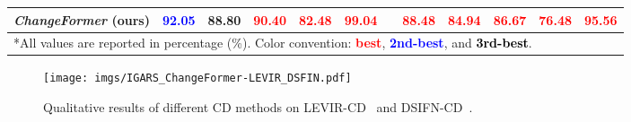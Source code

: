\documentclass{article}
\def\ChangeFormer{{\textit{ChangeFormer}}}
\begin{document}
\begin{table*}[htb]
\begin{tabular}{lccccccccccc}
        \ChangeFormer{} (ours) &    \textcolor{blue}{\bf 92.05} & 
                                    {\bf 88.80} & 
                                    \textcolor{red}{\bf 90.40} & 
                                    \textcolor{red}{\bf 82.48} & 
                                    \textcolor{red}{\bf 99.04} && 
                                    \textcolor{red}{\bf 88.48} & 
                                    \textcolor{red}{\bf 84.94} & 
                                    \textcolor{red}{\bf 86.67} & 
                                    \textcolor{red}{\bf 76.48} & 
                                    \textcolor{red}{\bf 95.56}\\
        \bottomrule
        \multicolumn{12}{l}{{*All values are reported in percentage (\%). Color convention: \textcolor{red}{\bf best}, \textcolor{blue}{\bf 2nd-best}, and \textcolor{black}{\bf 3rd-best}.}}
    \end{tabular}
    \label{tab:results}
\end{table*}
\begin{figure*}[tbh]
    \centering
    \texttt{[image: imgs/IGARS\_ChangeFormer-LEVIR\_DSFIN.pdf]}
    \caption{Qualitative results of different CD methods on LEVIR-CD~\cite{LEVIR} and DSIFN-CD~\cite{DSIFN}.}
    \label{fig:LEVIR}
\end{figure*}
\end{document}
